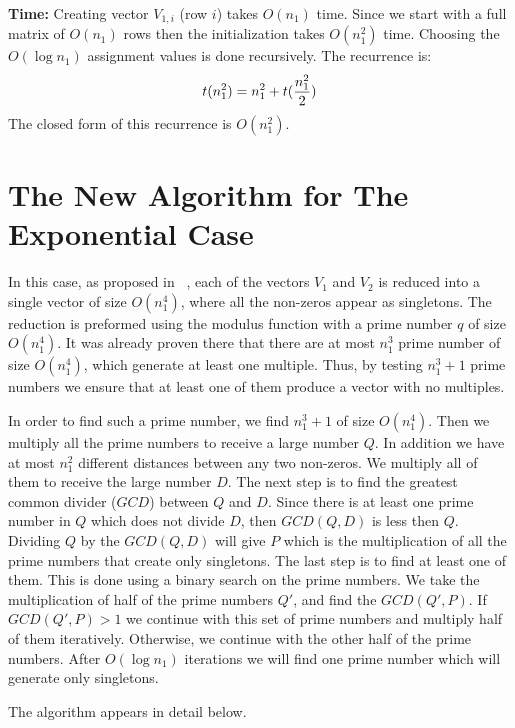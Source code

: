 \documentclass[11pt,amssymb]{article}
\begin{document}
{\bf Time:} Creating vector $V_{1,i}$ (row $i$) takes $O(n_1)$ time.
Since we start with a full matrix of $O(n_1)$ rows then the
initialization takes $O(n_1^2)$ time. Choosing the $O(\log n_1)$
assignment values is done recursively. The recurrence is:
$$ t(n_1^2) = n_1^2 + t({n_1^2\over 2})$$
The closed form of this recurrence is $O(n_1^2)$.




\section{The New Algorithm for The Exponential Case}\label{s:Exp}

In this case, as proposed in ~\cite{LR07}, each of the vectors $V_1$
and $V_2$ is reduced into a single vector of size $O(n_1^4)$, where
all the non-zeros appear as singletons. The reduction is preformed
using the modulus function with a prime number $q$ of size
$O(n_1^4)$. It was already proven there that there are at most
$n_1^3$ prime number of size $O(n_1^4)$, which generate at least one
multiple. Thus, by testing $n_1^3+1$ prime numbers we ensure that at
least one of them produce a vector with no multiples.

In order to find such a prime number, we find $n_1^3+1$ of size
$O(n_1^4)$. Then we multiply all the prime numbers to receive a
large number $Q$. In addition we have at most $n_1^2$ different
distances between any two non-zeros. We multiply all of them to
receive the large number $D$. The next step is to find the greatest
common divider ($GCD$) between $Q$ and $D$. Since there is at least
one prime number in $Q$ which does not divide $D$, then $GCD(Q,D)$
is less then $Q$. Dividing $Q$ by the $GCD(Q,D)$ will give $P$ which
is the multiplication of all the prime numbers that create only
singletons. The last step is to find at least one of them. This is
done using a binary search on the prime numbers. We take the
multiplication of half of the prime numbers $Q'$, and find the
$GCD(Q',P)$. If $GCD(Q',P) > 1$ we continue with this set of prime
numbers and multiply half of them iteratively. Otherwise, we
continue with the other half of the prime numbers. After $O(\log
n_1)$ iterations we will find one prime number which will generate
only singletons.

The algorithm appears in detail below.
\end{document}
